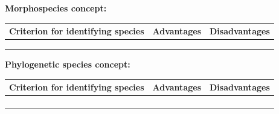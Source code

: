 \begin{frame}[t]
    \begin{adjustwidth}{-2em}{-1.5em}

    \vspace{-3mm}
    \textbf{Morphospecies concept:}
    \vspace{-3mm}
    \begin{table}%
        \centering
        \begin{tabular}{ L{3.7cm} | L{3.7cm} | L{3.7cm} }
            Criterion for identifying species & Advantages & Disadvantages \\
            \hline
             &
             &
             \\
            \cmask{} & \cmask{} & \cmask{} \\
            \cmask{} & \cmask{} & \cmask{} \\
        \end{tabular}
    \end{table}

    \vspace{2mm}
    \textbf{Phylogenetic species concept:}
    \vspace{-3mm}
    \begin{table}%
        \centering
        \begin{tabular}{ L{3.7cm} | L{3.7cm} | L{3.7cm} }
            Criterion for identifying species & Advantages & Disadvantages \\
            \hline
             &
             &
             \\
            \cmask{} &
             &
            \cmask{} \\
            \cmask{} & \cmask{} & \cmask{} \\
            \cmask{} & \cmask{} & \cmask{} \\
        \end{tabular}
    \end{table}
    \end{adjustwidth}
\end{frame}

